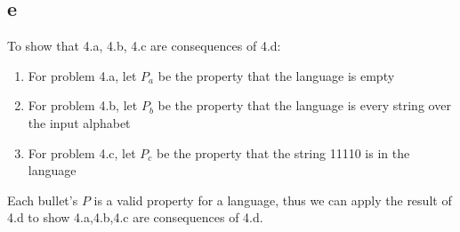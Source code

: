 \documentclass[letterpaper,notitlepage,twoside]{article}
\begin{document}
\subsection*{e}
To show that 4.a, 4.b, 4.c are consequences of 4.d:
\begin{enumerate}
\item For problem 4.a, let $P_a$ be the property that the language is empty
\item For problem 4.b, let $P_b$ be the property that the language is every string over the input alphabet
\item For problem 4.c, let $P_c$ be the property that the string 11110 is in the language
\end{enumerate}
Each bullet's $P$ is a valid property for a language, thus we can apply the result of 4.d to show 4.a,4.b,4.c are consequences of 4.d.
\end{document}
